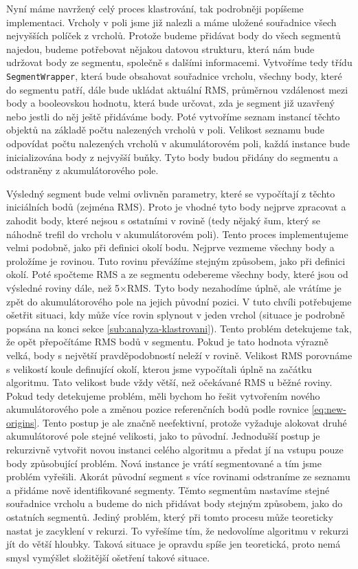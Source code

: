 \documentclass[11pt,twoside,a4paper]{book}
\begin{document}
Nyní máme navržený celý proces klastrování, tak podrobněji popíšeme implementaci. Vrcholy v poli jsme již nalezli a máme uložené souřadnice všech nejvyšších políček z vrcholů. Protože budeme přidávat body do všech segmentů najedou, budeme potřebovat nějakou datovou strukturu, která nám bude udržovat body ze segmentu, společně s dalšími informacemi. Vytvoříme tedy třídu \verb|SegmentWrapper|, která bude obsahovat souřadnice vrcholu, všechny body, které do segmentu patří, dále bude ukládat aktuální RMS, průměrnou vzdálenost mezi body a booleovskou hodnotu, která bude určovat, zda je segment již uzavřený nebo jestli do něj ještě přidáváme body. Poté vytvoříme seznam instancí těchto objektů na základě počtu nalezených vrcholů v poli. Velikost seznamu bude odpovídat počtu nalezených vrcholů v akumulátorovém poli, každá instance bude inicializována body z nejvyšší buňky. Tyto body budou přidány do segmentu a odstraněny z akumulátorového pole.

Výsledný segment bude velmi ovlivněn parametry, které se vypočítají z těchto iniciálních bodů (zejména RMS). Proto je vhodné tyto body nejprve zpracovat a zahodit body, které nejsou s ostatními v rovině (tedy nějaký šum, který se náhodně trefil do vrcholu v akumulátorovém poli). Tento proces implementujeme velmi podobně, jako při definici okolí bodu. Nejprve vezmeme všechny body a proložíme je rovinou. Tuto rovinu převážíme stejným způsobem, jako při definici okolí. Poté spočteme RMS a ze segmentu odebereme všechny body, které jsou od výsledné roviny dále, než 5$\times$RMS. Tyto body nezahodíme úplně, ale vrátíme je zpět do akumulátorového pole na jejich původní pozici. V tuto chvíli potřebujeme ošetřit situaci, kdy může více rovin splynout v jeden vrchol (situace je podrobně popsána na konci sekce \ref{sub:analyza-klastrovani}). Tento problém detekujeme tak, že opět přepočítáme RMS bodů v segmentu. Pokud je tato hodnota výrazně velká, body s největší pravděpodobností neleží v rovině. Velikost RMS porovnáme s velikostí koule definující okolí, kterou jsme vypočítali úplně na začátku algoritmu. Tato velikost bude vždy větší, než očekávané RMS u běžné roviny. Pokud tedy detekujeme problém, měli bychom ho řešit vytvořením nového akumulátorového pole a změnou pozice referenčních bodů podle rovnice \ref{eq:new-origins}. Tento postup je ale značně neefektivní, protože vyžaduje alokovat druhé akumulátorové pole stejné velikosti, jako to původní. Jednodušší postup je rekurzivně vytvořit novou instanci celého algoritmu a předat jí na vstupu pouze body způsobující problém. Nová instance je vrátí segmentované a tím jsme problém vyřešili. Akorát původní segment s více rovinami odstraníme ze seznamu a přidáme nově identifikované segmenty. Těmto segmentům nastavíme stejné souřadnice vrcholu a budeme do nich přidávat body stejným způsobem, jako do ostatních segmentů. Jediný problém, který při tomto procesu může teoreticky nastat je zacyklení v rekurzi. To vyřešíme tím, že nedovolíme algoritmu v rekurzi jít do větší hloubky. Taková situace je opravdu spíše jen teoretická, proto nemá smysl vymýšlet složitější ošetření takové situace.
\end{document}
